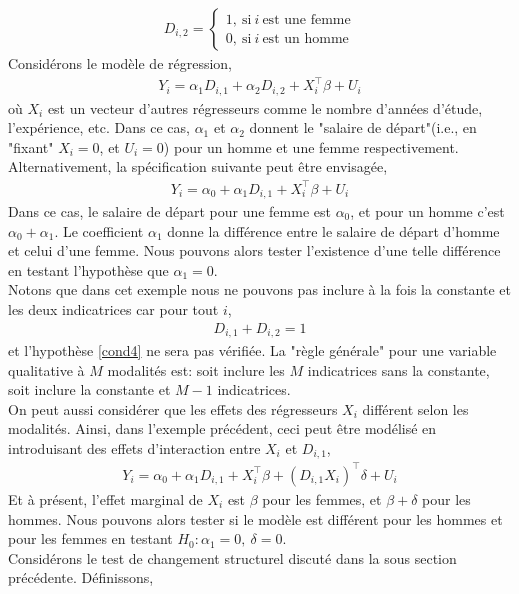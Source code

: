 \begin{align*}
D_{i, 2} = \left\{
\begin{array}{c}
1, \  \textrm{si} \  i  \ \textrm{est une femme}\\
0, \  \textrm{si} \  i  \ \textrm{est un homme}
\end{array}
\right.
\end{align*}
Considérons le modèle de régression,
\begin{align*}
Y_i  = \alpha_1D_{i,1}+\alpha_2D_{i, 2} + X_i^\top\beta + U_i
\end{align*}
où $X_i$ est un vecteur d'autres régresseurs comme le nombre d'années d'étude, l'expérience, etc. Dans ce cas, $\alpha_1$ et $\alpha_2$ donnent le "salaire de départ"(i.e., en "fixant" $X_i=0$, et $U_i = 0$) pour un homme et une femme respectivement. Alternativement, la spécification suivante peut être envisagée,
\begin{align*}
Y_i = \alpha_0 + \alpha_1D_{i, 1} + X_i^\top\beta + U_i
\end{align*}
Dans ce cas, le salaire de départ pour une femme est $\alpha_0$, et pour un homme c'est $\alpha_0+\alpha_1$. Le coefficient $\alpha_1$ donne la différence entre le salaire de départ d'homme et celui d'une femme. Nous pouvons alors tester l'existence d'une telle différence en testant l'hypothèse que $\alpha_1 = 0$.\\
Notons que dans cet exemple nous ne pouvons pas inclure à la fois la constante et les deux indicatrices car pour tout $i$,
\begin{align*}
D_{i, 1}+D_{i, 2} = 1
\end{align*}
et l'hypothèse \ref{cond4} ne sera pas vérifiée. La "règle générale" pour une variable qualitative à $M$ modalités est: soit inclure les $M$ indicatrices sans la constante, soit inclure la constante et $M-1$ indicatrices.\\
On peut aussi considérer que les effets des régresseurs $X_i$ différent selon les modalités. Ainsi, dans l'exemple précédent, ceci peut être modélisé en introduisant des effets d'interaction entre $X_i$ et $D_{i, 1}$,
\begin{align*}
Y_i = \alpha_0 + \alpha_1D_{i, 1} + X_i^\top\beta + (D_{i, 1}X_i)^\top\delta + U_i
\end{align*} 
Et à présent, l'effet marginal de $X_i$ est $\beta$ pour les femmes, et $\beta+\delta$ pour les hommes. Nous pouvons alors tester si le modèle est différent pour les hommes et pour les femmes en testant $H_0: \alpha_1 = 0, \ \delta = 0$.\\
Considérons le test de changement structurel discuté dans la sous section précédente. Définissons,

